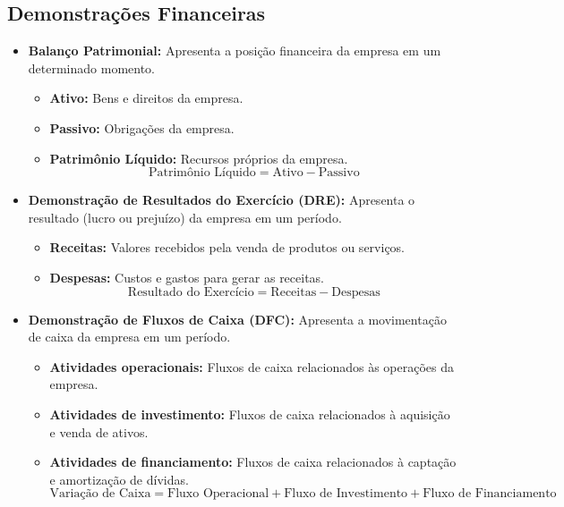 \documentclass{article}
\begin{document}
\subsection{Demonstrações Financeiras}
\begin{itemize}
    \item \textbf{Balanço Patrimonial:} Apresenta a posição financeira da empresa em um determinado momento. 
    \begin{itemize}
        \item \textbf{Ativo:} Bens e direitos da empresa. 
        \item \textbf{Passivo:} Obrigações da empresa. 
        \item \textbf{Patrimônio Líquido:} Recursos próprios da empresa. 
        \begin{equation}
            \text{Patrimônio Líquido} = \text{Ativo} - \text{Passivo}
        \end{equation}
    \end{itemize}
    \item \textbf{Demonstração de Resultados do Exercício (DRE):} Apresenta o resultado (lucro ou prejuízo) da empresa em um período. 
    \begin{itemize}
        \item \textbf{Receitas:} Valores recebidos pela venda de produtos ou serviços. 
        \item \textbf{Despesas:} Custos e gastos para gerar as receitas. 
        \begin{equation}
            \text{Resultado do Exercício} = \text{Receitas} - \text{Despesas}
        \end{equation}
    \end{itemize}
    \item \textbf{Demonstração de Fluxos de Caixa (DFC):} Apresenta a movimentação de caixa da empresa em um período. 
    \begin{itemize}
        \item \textbf{Atividades operacionais:} Fluxos de caixa relacionados às operações da empresa. 
        \item \textbf{Atividades de investimento:} Fluxos de caixa relacionados à aquisição e venda de ativos. 
        \item \textbf{Atividades de financiamento:} Fluxos de caixa relacionados à captação e amortização de dívidas. 
        \begin{equation}
            \text{Variação de Caixa} = \text{Fluxo Operacional} + \text{Fluxo de Investimento} + \text{Fluxo de Financiamento}

\end{equation}
\end{itemize}
\end{itemize}
\end{document}
